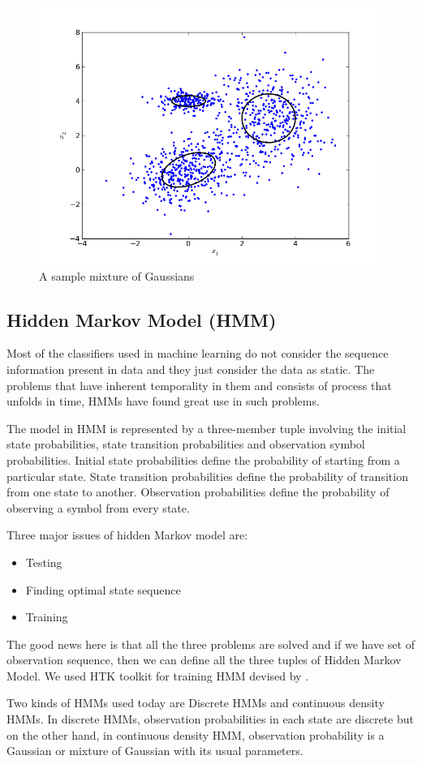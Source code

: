 \begin{figure}[!htbp]
\centering
\includegraphics[scale=0.4]{snaps/sample_gmm.png}
\caption{A sample mixture of Gaussians}
\label{fig:gmm}
\end{figure}
\subsection{Hidden Markov Model (HMM)}
Most of the classifiers used in machine learning do not consider the sequence information present in data and they just consider the data as static. The problems that have inherent temporality in them and consists of process that unfolds in time, HMMs have found great use in such problems.\par
The model in HMM is represented by a three-member tuple involving the initial state probabilities, state transition probabilities and observation symbol probabilities. Initial state probabilities define the probability of starting from a particular state. State transition probabilities define the probability of transition from one state to another. Observation probabilities define the probability of observing a symbol from every state.\par
Three major issues of hidden Markov model are:
\begin{itemize}
\item Testing
\item Finding optimal state sequence
\item Training
\end{itemize}
The good news here is that all the three problems are solved and if we have set of observation sequence, then we can define all the three tuples of Hidden Markov Model. We used HTK toolkit for training HMM devised by \cite{HTK}. \par
Two kinds of HMMs used today are Discrete HMMs and continuous density HMMs. In discrete HMMs, observation probabilities in each state are discrete but on the other hand, in continuous density HMM, observation probability is a Gaussian or mixture of Gaussian with its usual parameters.  

